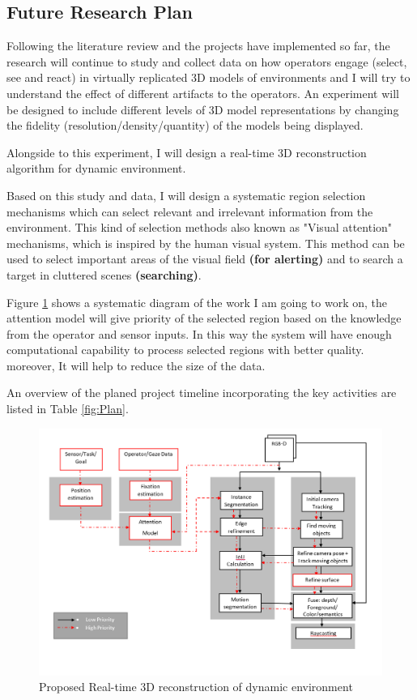 \subsection{Future Research Plan}

Following the literature review and the projects have implemented so far, the research will continue to study and collect data on how operators engage (select, see and react) in virtually replicated 3D models of environments and I will try to understand the effect of different artifacts to the operators. An experiment will be designed to include different levels of 3D model representations by changing the fidelity (resolution/density/quantity) of the models being displayed.

Alongside to this experiment, I will design a real-time 3D reconstruction algorithm for dynamic environment. 

Based on this study and data, I will design a systematic region selection mechanisms which can select relevant and irrelevant information from the environment. This kind of selection methods also known as "Visual attention" mechanisms, which is inspired by the human visual system. This method can be used to select important areas of the visual field \textbf{(for alerting)} and to search a target in cluttered scenes \textbf{(searching)}. 

Figure \ref{fig:Attention} shows a systematic diagram of the work I am going to work on, the attention model will give priority of the selected region based on the knowledge from the operator and sensor inputs. In this way the system will have enough computational capability to process selected regions with better quality. moreover, It will help to reduce the size of the data. 

An overview of the planed project timeline incorporating the key activities are listed in Table \ref{fig:Plan}.

\begin{figure}[h]
    \centering
    \includegraphics[scale=0.55]{images/Dyn_Reco_Attention.PNG}
    \caption{Proposed Real-time 3D reconstruction of dynamic environment}
    \label{fig:Attention}
\end{figure}

